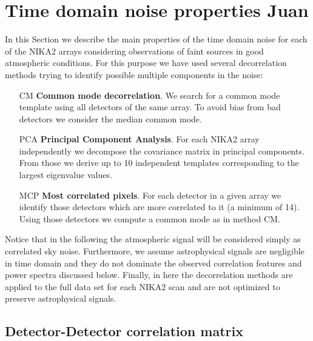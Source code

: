 %
%
%
%


%
%    
%
\section{Time domain noise properties {\color{YellowGreen} Juan}}
\label{se:noise}
In this Section we describe the main properties of the time domain noise for each of the NIKA2 arrays considering
observations of faint sources in good atmospheric conditions. For this purpose we have used several decorrelation methods trying to identify possible multiple components in the noise:

\begin{enumerate}
\item[CM] {\bf Common mode decorrelation}. We search for a common mode template using all detectors of the same array. To avoid bias from bad detectors we consider the median common mode.

\item[PCA] {\bf Principal Component Analysis}. For each NIKA2 array independently we decompose the covariance matrix in principal components. From those we derive up to 10 independent templates corresponding to the largest eigenvalue values.

\item[MCP] {\bf Most correlated pixels}. For each detector in a given array we identify those detectors which are more correlated to it (a minimum of 14). Using those detectors we compute a common mode as in method CM. 

\end{enumerate}

Notice that in the following the atmospheric signal will be considered simply as correlated sky noise. Furthermore, we assume astrophysical signals are negligible in time domain and they do not dominate the observed correlation features and power spectra discussed below. Finally, in here the decorrelation methods are applied to the full data set for each NIKA2 scan and are not optimized to preserve astrophysical signals.
 
\subsection{Detector-Detector correlation matrix}


